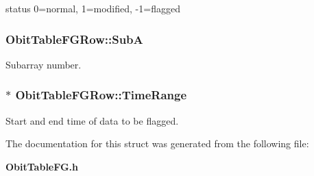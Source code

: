 status 0=normal, 1=modified, -1=flagged 

\subsubsection{ {\bf Obit\-Table\-FGRow::Sub\-A}}\label{structObitTableFGRow_o7}


Subarray number. 

\subsubsection{$\ast$ {\bf Obit\-Table\-FGRow::Time\-Range}}\label{structObitTableFGRow_o10}


Start and end time of data to be flagged. 



The documentation for this struct was generated from the following file:\begin{CompactItemize}
\item 
{\bf Obit\-Table\-FG.h}\end{CompactItemize}

